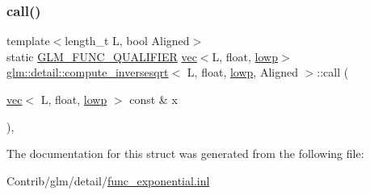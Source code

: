 \subsubsection{\texorpdfstring{call()}{call()}}
{\footnotesize\ttfamily template$<$length\+\_\+t L, bool Aligned$>$ \\
static \mbox{\hyperlink{setup_8hpp_a33fdea6f91c5f834105f7415e2a64407}{G\+L\+M\+\_\+\+F\+U\+N\+C\+\_\+\+Q\+U\+A\+L\+I\+F\+I\+ER}} \mbox{\hyperlink{structglm_1_1vec}{vec}}$<$L, float, \mbox{\hyperlink{namespaceglm_a36ed105b07c7746804d7fdc7cc90ff25ae161af3fc695e696ce3bf69f7332bc2d}{lowp}}$>$ \mbox{\hyperlink{structglm_1_1detail_1_1compute__inversesqrt}{glm\+::detail\+::compute\+\_\+inversesqrt}}$<$ L, float, \mbox{\hyperlink{namespaceglm_a36ed105b07c7746804d7fdc7cc90ff25ae161af3fc695e696ce3bf69f7332bc2d}{lowp}}, Aligned $>$\+::call (\begin{DoxyParamCaption}\item[{\mbox{\hyperlink{structglm_1_1vec}{vec}}$<$ L, float, \mbox{\hyperlink{namespaceglm_a36ed105b07c7746804d7fdc7cc90ff25ae161af3fc695e696ce3bf69f7332bc2d}{lowp}} $>$ const \&}]{x }\end{DoxyParamCaption})\hspace{0.3cm}{\ttfamily [inline]}, {\ttfamily [static]}}



The documentation for this struct was generated from the following file\+:\begin{DoxyCompactItemize}
\item 
Contrib/glm/detail/\mbox{\hyperlink{func__exponential_8inl}{func\+\_\+exponential.\+inl}}\end{DoxyCompactItemize}
